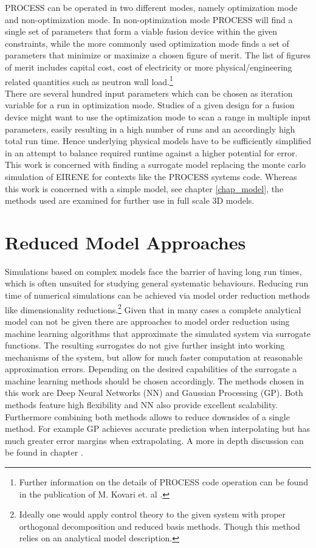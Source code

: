 	PROCESS can be operated in two different modes, namely optimization mode and non-optimization mode. In non-optimization mode PROCESS will find a single set of parameters that form a viable fusion device within the given constraints, while the more commonly used optimization mode finds a set of parameters that minimize or maximize a chosen figure of merit. The list of figures of merit includes capital cost, cost of electricity or more physical/engineering related quantities such as neutron wall load.\footnote{Further information on the details of PROCESS code operation can be found in the publication of M. Kovari et. al \cite{process}.}\\
	There are several hundred input parameters which can be chosen as iteration variable for a run in optimization mode. Studies of a given design for a fusion device might want to use the optimization mode to scan a range in multiple input parameters, easily resulting in a high number of runs and an accordingly high total run time. Hence underlying physical models have to be sufficiently simplified in an attempt to balance required runtime against a higher potential for error.\\
	
	This work is concerned with finding a surrogate model replacing the monte carlo simulation of EIRENE for contexts like the PROCESS systems code. Whereas this work is concerned with a simple model, see chapter \ref{chap_model}, the methods used are examined for further use in full scale 3D models.
	
	
	\section{Reduced Model Approaches}
	Simulations based on complex models face the barrier of having long run times, which is often unsuited for studying general systematic behaviours. Reducing run time of numerical simulations can be achieved via model order reduction methods like dimensionality reductions.\footnote{Ideally one would apply control theory to the given system with proper orthogonal decomposition and reduced basis methods. Though this method relies on an analytical model description.}
	Given that in many cases a complete analytical model can not be given there are approaches to model order reduction using machine learning algorithms that approximate the simulated system via surrogate functions. The resulting surrogates do not give further insight into working mechanisms of the system, but allow for much faster computation at reasonable approximation errors. Depending on the desired capabilities of the surrogate a machine learning methods should be chosen accordingly. The methods chosen in this work are Deep Neural Networks (NN) and Gaussian Processing (GP). Both methods feature high flexibility and NN also provide excellent scalability. Furthermore combining both methods allows to reduce downsides of a single method. For example GP achieves accurate prediction when interpolating but has much greater error margins when extrapolating. A more in depth discussion can be found in chapter \cite{chap_method}. 

	